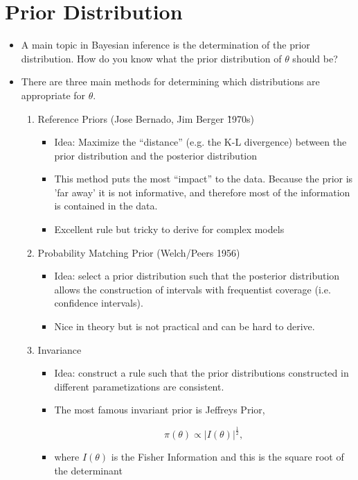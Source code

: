 \documentclass[]{article}
\begin{document}
\section{Prior Distribution}
\begin{itemize}
	\item A main topic in Bayesian inference is the determination of the prior distribution. How do you know what the prior distribution of $\theta$ should be?
	\item There are three main methods for determining which distributions are appropriate for $\theta$. 
	\begin{enumerate}
		\item Reference Priors (Jose Bernado, Jim Berger \~ 1970s)
				\begin{itemize}
					\item Idea: Maximize the "`distance"' (e.g. the K-L divergence) between the prior distribution and the posterior distribution
					\item This method puts the most "`impact"' to the data. Because the prior is 'far away' it is not informative, and therefore most of the information is contained in the data. 
					\item Excellent rule but tricky to derive for complex models
				\end{itemize}
		
	\item Probability Matching Prior (Welch/Peers 1956)
			\begin{itemize}
				\item Idea: select a prior distribution such that the posterior distribution allows the construction of intervals with frequentist coverage (i.e. confidence intervals).
				\item Nice in theory but is not practical and can be hard to derive. 
			\end{itemize}
			
		\item Invariance
		
			\begin{itemize}
				\item Idea: construct a rule such that the prior distributions constructed in different parametizations are consistent.
				\item The most famous invariant prior is Jeffreys Prior,
	
				\begin{equation}
				\pi(\theta)\propto |I(\theta)|^{\frac{1}{2}},
				\label{jprior}
				\end{equation}
	
				\item where  $I(\theta)$ is the Fisher Information and this is the square root of the determinant
				\end {itemize}
				
	\end{enumerate}
\end{itemize}
\end{document}
